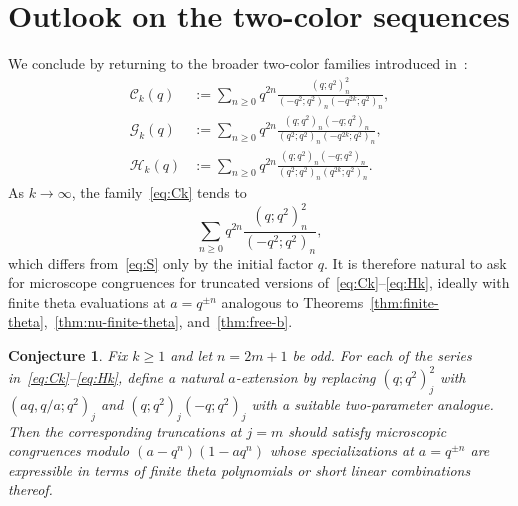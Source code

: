 \documentclass[reqno]{amsart}
\theoremstyle{definition}
\theoremstyle{plain}
\newtheorem{conjecture}[theorem]{Conjecture}
\theoremstyle{remark}
\newcommand{\Ck}{\mathcal{C}_k}
\newcommand{\Gk}{\mathcal{G}_k}
\newcommand{\Hk}{\mathcal{H}_k}
\numberwithin{equation}{section}
\begin{document}
\section{Outlook on the two-color sequences}\label{sec:outlook}

We conclude by returning to the broader two-color families introduced in~\cite{andrews-elbachraoui}:
\begin{align}
\Ck(q)&:=\sum_{n\ge 0} q^{2n}\frac{(q;q^2)_n^2}{(-q^2;q^2)_n(-q^{2k};q^2)_n},\label{eq:Ck}\\
\Gk(q)&:=\sum_{n\ge 0} q^{2n}\frac{(q;q^2)_n(-q;q^2)_n}{(q^2;q^2)_n(-q^{2k};q^2)_n},\label{eq:Gk}\\
\Hk(q)&:=\sum_{n\ge 0} q^{2n}\frac{(q;q^2)_n(-q;q^2)_n}{(q^2;q^2)_n(q^{2k};q^2)_n}.\label{eq:Hk}
\end{align}
As $k\to\infty$, the family~\eqref{eq:Ck} tends to
\[
\sum_{n\ge 0} q^{2n}\frac{(q;q^2)_n^2}{(-q^2;q^2)_n},
\]
which differs from~\eqref{eq:S} only by the initial factor $q$. It is therefore natural to ask for microscope congruences for truncated versions of~\eqref{eq:Ck}--\eqref{eq:Hk}, ideally with finite theta evaluations at $a=q^{\pm n}$ analogous to Theorems~\ref{thm:finite-theta},~\ref{thm:nu-finite-theta}, and~\ref{thm:free-b}.

\begin{conjecture}\label{conj:broader}
Fix $k\ge 1$ and let $n=2m+1$ be odd. For each of the series in~\eqref{eq:Ck}--\eqref{eq:Hk}, define a natural $a$-extension by replacing $(q;q^2)_j^2$ with $(aq,q/a;q^2)_j$ and $(q;q^2)_j(-q;q^2)_j$ with a suitable two-parameter analogue. Then the corresponding truncations at $j=m$ should satisfy microscopic congruences modulo $(a-q^n)(1-aq^n)$ whose specializations at $a=q^{\pm n}$ are expressible in terms of finite theta polynomials or short linear combinations thereof.
\end{conjecture}
\end{document}
